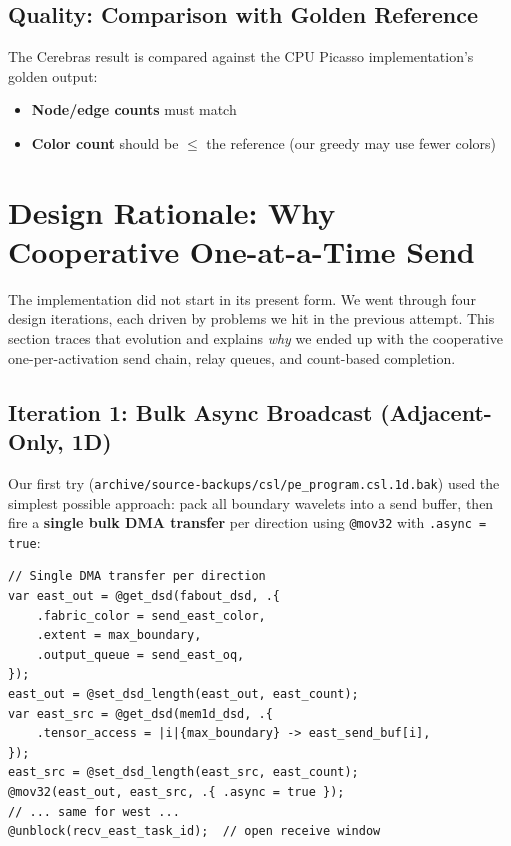 \documentclass[11pt,letterpaper]{article}
\begin{document}
\subsection{Quality: Comparison with Golden Reference}

The Cerebras result is compared against the CPU Picasso implementation's golden output:
\begin{itemize}[nosep]
  \item \textbf{Node/edge counts} must match
  \item \textbf{Color count} should be $\leq$ the reference (our greedy may use fewer colors)
\end{itemize}

\section{Design Rationale: Why Cooperative One-at-a-Time Send}
\label{sec:rationale}

The implementation did not start in its present form. We went through four design iterations, each driven by problems we hit in the previous attempt. This section traces that evolution and explains \emph{why} we ended up with the cooperative one-per-activation send chain, relay queues, and count-based completion.

\subsection{Iteration 1: Bulk Async Broadcast (Adjacent-Only, 1D)}

Our first try (\texttt{archive/source-backups/csl/pe\_program.csl.1d.bak}) used the simplest possible approach: pack all boundary wavelets into a send buffer, then fire a \textbf{single bulk DMA transfer} per direction using \texttt{@mov32} with \texttt{.async = true}:

\begin{lstlisting}[language=CSL, caption={Original bulk-send approach (\texttt{archive/source-backups/csl/pe\_program.csl.1d.bak})}, label=lst:oldsend]
// Single DMA transfer per direction
var east_out = @get_dsd(fabout_dsd, .{
    .fabric_color = send_east_color,
    .extent = max_boundary,
    .output_queue = send_east_oq,
});
east_out = @set_dsd_length(east_out, east_count);
var east_src = @get_dsd(mem1d_dsd, .{
    .tensor_access = |i|{max_boundary} -> east_send_buf[i],
});
east_src = @set_dsd_length(east_src, east_count);
@mov32(east_out, east_src, .{ .async = true });
// ... same for west ...
@unblock(recv_east_task_id);  // open receive window
\end{lstlisting}
\end{document}
